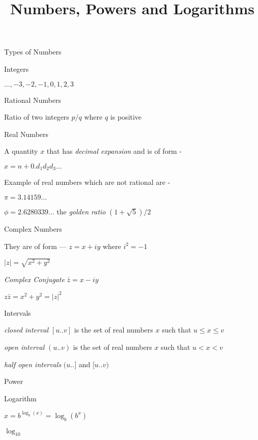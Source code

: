 \documentclass{slides}
\title{Numbers, Powers and Logarithms}
\begin{document}
\maketitle
\begin{slide}
  \begin{center}
    Types of Numbers
  \end{center}  
    Integers

    $ \ldots , -3 , -2, -1, 0, 1, 2, 3 $
    
    Rational Numbers
    
    \normalsize Ratio of two integers $p/q$ where $q$ is positive 

    Real Numbers

    A quantity $x$ that has {\it decimal expansion} and is of form -

    $ x = n + 0.d_{1}d_{2}d_{3}\ldots $

    Example of real numbers which are not rational are -

    $\pi = 3.14159\ldots $
    
    $\phi = 2.6280339\ldots $ the {\it golden ratio } $ (1+\sqrt{5})/2$

    Complex Numbers
    
    They are of form --- $z = x + iy$ where $ i^2 = -1 $

    $ \left|z\right| = \sqrt{x^2 + y^2}$

    {\it Complex Conjugate} $ \bar{z} = x - iy $

    $z\bar{z} = x^2 + y^2 = \left|z\right|^2  $

    Intervals

    {\it closed interval} $ [u..v] $ is the set of real numbers $x$ such that $ u \le x \le v$

    {\it open interval} $ (u..v) $ is the set of real numbers $x$ such that $ u <  x < v$

    {\it half open intervals} $(u..]$ and $[u..v)$

\end{slide}

\begin{slide}
  \begin{center}
    Power
  \end{center}
\end{slide}

\begin{slide}
  \begin{center}
    Logarithm

    
    $ x = b^{\log_b({x})} = \log_b(b^x)$

    $\log_{10}$
  \end{center}
\end{slide}
\end{document}
